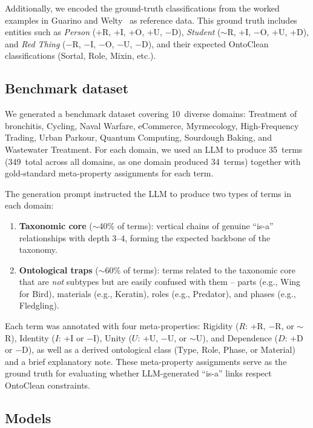 \documentclass{IOS-Book-Article}
\begin{document}
Additionally, we encoded the ground-truth classifications from the
worked examples in Guarino and Welty~\cite{guarino2000formal} as
reference data.  This ground truth includes entities such as
\emph{Person} (+R, +I, +O, +U, $-$D), \emph{Student} ($\sim$R, +I,
$-$O, +U, +D), and \emph{Red Thing} ($-$R, $-$I, $-$O, $-$U, $-$D),
and their expected OntoClean classifications (Sortal, Role, Mixin,
etc.).

\subsection{Benchmark dataset}
\label{sec:dataset}

We generated a benchmark dataset covering 10~diverse domains:
Treatment of bronchitis, Cycling, Naval Warfare, eCommerce,
Myrmecology, High-Frequency Trading, Urban Parkour, Quantum Computing,
Sourdough Baking, and Wastewater Treatment.  For each domain, we used
an LLM to
produce 35~terms (349~total across all domains, as one domain produced
34~terms) together with gold-standard meta-property assignments for
each term.

The generation prompt instructed the LLM to produce two types of terms
in each domain:

\begin{enumerate}
\item \textbf{Taxonomic core} ($\sim$40\% of terms): vertical chains of
  genuine ``is-a'' relationships with depth 3--4, forming the expected
  backbone of the taxonomy.
\item \textbf{Ontological traps} ($\sim$60\% of terms): terms related
  to the taxonomic core that are \emph{not} subtypes but are easily
  confused with them -- parts (e.g., Wing for Bird), materials (e.g.,
  Keratin), roles (e.g., Predator), and phases (e.g., Fledgling).
\end{enumerate}

Each term was annotated with four meta-properties: Rigidity ($R$:
+R, $-$R, or $\sim$R), Identity ($I$: +I or $-$I), Unity ($U$: +U,
$-$U, or $\sim$U), and Dependence ($D$: +D or $-$D), as well as a
derived ontological class (Type, Role, Phase, or Material) and a brief
explanatory note.  These meta-property assignments serve as the ground
truth for evaluating whether LLM-generated ``is-a'' links respect
OntoClean constraints.

\subsection{Models}
\label{sec:models}
\end{document}
